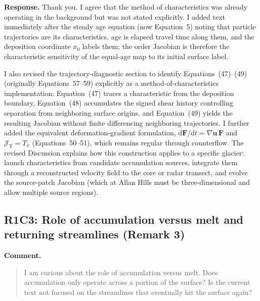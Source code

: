 \documentclass[11pt]{article}
\newcommand{\response}[1]{\noindent\textcolor{responseblue}{#1}}
\begin{document}
\response{\textbf{Response.} Thank you. I agree that the method of characteristics was already operating in the background but was not stated explicitly. I added text immediately after the steady age equation (now Equation~5) noting that particle trajectories are its characteristics, age is elapsed travel time along them, and the deposition coordinate \(x_0\) labels them; the order Jacobian is therefore the characteristic sensitivity of the equal-age map to its initial surface label.}

\medskip

\response{I also revised the trajectory-diagnostic section to identify Equations~(47)--(49) (originally Equations~57--59) explicitly as a method-of-characteristics implementation: Equation~(47) traces a characteristic from the deposition boundary, Equation~(48) accumulates the signed shear history controlling separation from neighboring surface origins, and Equation~(49) yields the resulting Jacobian without finite differencing neighboring trajectories. I further added the equivalent deformation-gradient formulation, \(\mathrm{d}\bm{F}/\mathrm{d}t=\nabla\bm{u}\,\bm{F}\) and \(\mathcal{J}_{\mathrm{T}}=T_x\) (Equations~50--51), which remains regular through counterflow. The revised Discussion explains how this construction applies to a specific glacier: launch characteristics from candidate accumulation sources, integrate them through a reconstructed velocity field to the core or radar transect, and evolve the source-patch Jacobian (which at Allan Hills must be three-dimensional and allow multiple source regions).}

\subsection*{R1C3: Role of accumulation versus melt and returning streamlines (Remark 3)}

\noindent\textbf{Comment.}
\begin{quote}
I am curious about the role of accumulation versus melt. Does accumulation only operate across a portion of the surface? Is the current text not focused on the streamlines that eventually hit the surface again?
\end{quote}
\end{document}

